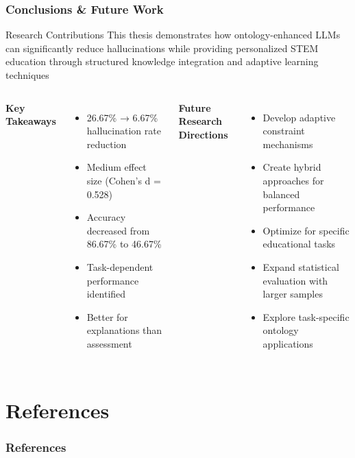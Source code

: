 \documentclass{beamer}
\begin{document}
\begin{frame}
\frametitle{Conclusions \& Future Work}

\begin{alertblock}{Research Contributions}
This thesis demonstrates how ontology-enhanced LLMs can significantly reduce hallucinations while providing personalized STEM education through structured knowledge integration and adaptive learning techniques
\end{alertblock}

\begin{columns}

\textbf{Key Takeaways}
\begin{itemize}
    \item 26.67\% → 6.67\% hallucination rate reduction
    \item Medium effect size (Cohen's d = 0.528)
    \item Accuracy decreased from 86.67\% to 46.67\%
    \item Task-dependent performance identified
    \item Better for explanations than assessment
\end{itemize}

\textbf{Future Research Directions}
\begin{itemize}
    \item Develop adaptive constraint mechanisms
    \item Create hybrid approaches for balanced performance
    \item Optimize for specific educational tasks
    \item Expand statistical evaluation with larger samples
    \item Explore task-specific ontology applications
\end{itemize}

\end{columns}
\end{frame}

\section{References}
\begin{frame}[allowframebreaks]
\frametitle{References}


\nocite{horrocks2024owl}
\nocite{pallets2024quart}
\nocite{rodriguez2024adaptive}
\nocite{scibite2024ontologies}
\nocite{wilson2024educational}
\nocite{chen2024comparing}
\nocite{rivera2024impact}


\end{frame}
\end{document}
